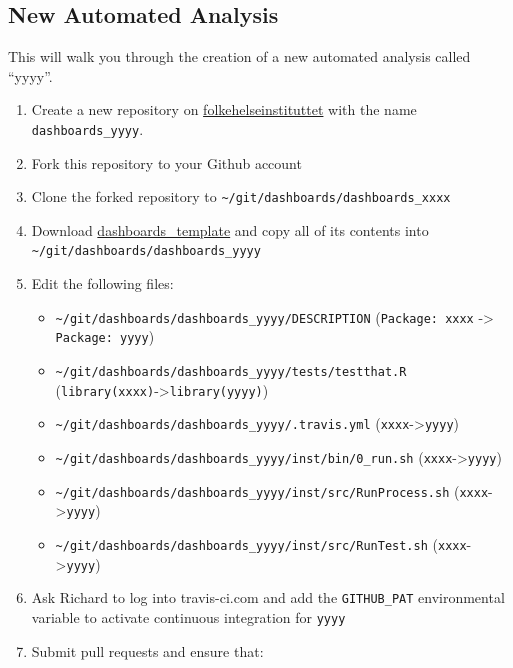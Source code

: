 \documentclass[12pt,]{article}
\providecommand{\tightlist}{%
  \setlength{\itemsep}{0pt}\setlength{\parskip}{0pt}}
\begin{document}
\subsection{New Automated Analysis}\label{newautomatedanalysis}

This will walk you through the creation of a new automated analysis
called ``yyyy''.

\begin{enumerate}
\def\labelenumi{\arabic{enumi}.}
\tightlist
\item
  Create a new repository on
  \href{https://github.com/folkehelseinstituttet}{folkehelseinstituttet}
  with the name \texttt{dashboards\_yyyy}.
\item
  Fork this repository to your Github account
\item
  Clone the forked repository to
  \texttt{\textasciitilde{}/git/dashboards/dashboards\_xxxx}
\item
  Download
  \href{https://github.com/folkehelseinstituttet/dashboards_xxxx}{dashboards\_template}
  and copy all of its contents into
  \texttt{\textasciitilde{}/git/dashboards/dashboards\_yyyy}
\item
  Edit the following files:

  \begin{itemize}
  \tightlist
  \item
    \texttt{\textasciitilde{}/git/dashboards/dashboards\_yyyy/DESCRIPTION}
    (\texttt{Package:\ xxxx} -\textgreater{} \texttt{Package:\ yyyy})
  \item
    \texttt{\textasciitilde{}/git/dashboards/dashboards\_yyyy/tests/testthat.R}
    (\texttt{library(xxxx)}-\textgreater{}\texttt{library(yyyy)})
  \item
    \texttt{\textasciitilde{}/git/dashboards/dashboards\_yyyy/.travis.yml}
    (\texttt{xxxx}-\textgreater{}\texttt{yyyy})
  \item
    \texttt{\textasciitilde{}/git/dashboards/dashboards\_yyyy/inst/bin/0\_run.sh}
    (\texttt{xxxx}-\textgreater{}\texttt{yyyy})
  \item
    \texttt{\textasciitilde{}/git/dashboards/dashboards\_yyyy/inst/src/RunProcess.sh}
    (\texttt{xxxx}-\textgreater{}\texttt{yyyy})
  \item
    \texttt{\textasciitilde{}/git/dashboards/dashboards\_yyyy/inst/src/RunTest.sh}
    (\texttt{xxxx}-\textgreater{}\texttt{yyyy})
  \end{itemize}
\item
  Ask Richard to log into travis-ci.com and add the \texttt{GITHUB\_PAT}
  environmental variable to activate continuous integration for
  \texttt{yyyy}
\item
  Submit pull requests and ensure that:


\end{enumerate}
\end{document}
